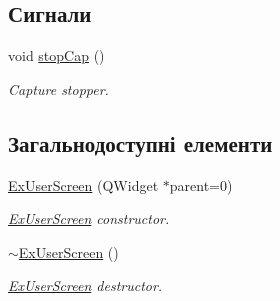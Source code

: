 \subsection*{Сигнали}
\begin{DoxyCompactItemize}
\item 
\hypertarget{classExUserScreen_ad4ebe68d01c167f183a7a9ef2aa06185}{void \hyperlink{classExUserScreen_ad4ebe68d01c167f183a7a9ef2aa06185}{stop\-Cap} ()}\label{classExUserScreen_ad4ebe68d01c167f183a7a9ef2aa06185}

\begin{DoxyCompactList}\small\item\em Capture stopper. \end{DoxyCompactList}\end{DoxyCompactItemize}
\subsection*{Загальнодоступні елементи}
\begin{DoxyCompactItemize}
\item 
\hyperlink{classExUserScreen_a8642db4f09c4528daf7e22ce2dcc1b47}{Ex\-User\-Screen} (Q\-Widget $\ast$parent=0)
\begin{DoxyCompactList}\small\item\em \hyperlink{classExUserScreen}{Ex\-User\-Screen} constructor. \end{DoxyCompactList}\item 
\hypertarget{classExUserScreen_a61421cd56bb9b54501c4cb34d297891f}{\hyperlink{classExUserScreen_a61421cd56bb9b54501c4cb34d297891f}{$\sim$\-Ex\-User\-Screen} ()}\label{classExUserScreen_a61421cd56bb9b54501c4cb34d297891f}

\begin{DoxyCompactList}\small\item\em \hyperlink{classExUserScreen}{Ex\-User\-Screen} destructor. \end{DoxyCompactList}\end{DoxyCompactItemize}
